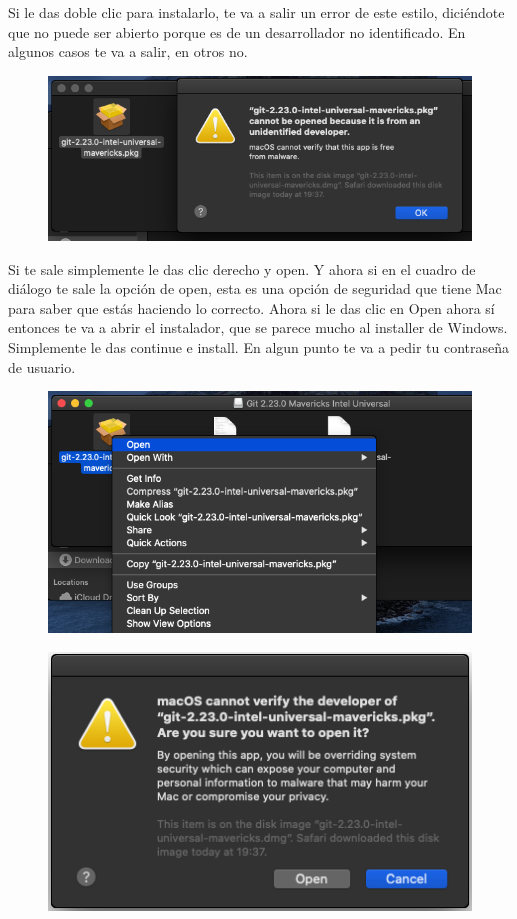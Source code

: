 \documentclass{article}
\begin{document}
Si le das doble clic para instalarlo, te va a salir un error de este estilo,
diciéndote que no puede ser abierto porque es de un desarrollador no
identificado. En algunos casos te va a salir, en otros no.

\begin{figure}[h!]
  \centering
  \includegraphics[scale=0.5]{./Pictures/026_mac_git.png}
\end{figure}

Si te sale simplemente le das clic derecho y open. Y ahora si en el cuadro de
diálogo te sale la opción de open, esta es una opción de seguridad que tiene
Mac para saber que estás haciendo lo correcto. Ahora si le das clic en Open
ahora sí entonces te va a abrir el instalador, que se parece mucho al installer
de Windows. Simplemente le das continue e install. En algun punto te va a pedir
tu contraseña de usuario.

\begin{figure}[h!]
  \centering
  \includegraphics[scale=0.5]{./Pictures/027_mac_git.png}
\end{figure}

\begin{figure}[h!]
  \centering
  \includegraphics[scale=0.5]{./Pictures/028_mac_git.png}
\end{figure}
\end{document}
